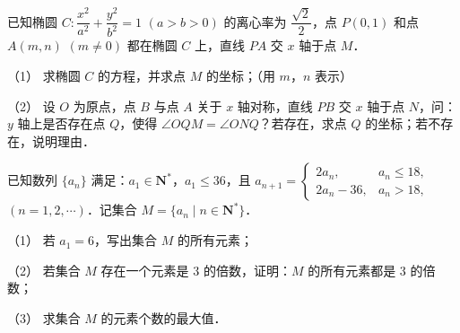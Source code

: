 \begin{question}
已知椭圆 \(C:\dfrac{x^{2}}{a^{2}}+\dfrac{y^{2}}{b^{2}}=1\) \((a>b>0)\) 的离心率为 \(\dfrac{\sqrt{2}}{2}\)，点 \(P(0,1)\) 和点 \(A(m,n)\) \((m\neq 0)\) 都在椭圆 \(C\) 上，直线 \(PA\) 交 \(x\) 轴于点 \(M\)．

（1） 求椭圆 \(C\) 的方程，并求点 \(M\) 的坐标；（用 \(m\)，\(n\) 表示）

（2） 设 \(O\) 为原点，点 \(B\) 与点 \(A\) 关于 \(x\) 轴对称，直线 \(PB\) 交 \(x\) 轴于点 \(N\)，问：\(y\) 轴上是否存在点 \(Q\)，使得 \(\angle OQM=\angle ONQ\)？若存在，求点 \(Q\) 的坐标；若不存在，说明理由．

\end{question}
\begin{question}
已知数列 \(\{a_{n}\}\) 满足：\(a_{1}\in\mathbf{N}^{*}\)，\(a_{1}\leqslant 36\)，且 $a_{n+1}=\begin{cases}2a_{n}, & a_{n}\leqslant 18,\\ 2a_{n}-36, & a_{n}>18,\end{cases}$ \((n=1,2,\cdots)\)．记集合 \(M=\{a_{n}\mid n\in\mathbf{N}^{*}\}\)．

（1） 若 \(a_{1}=6\)，写出集合 \(M\) 的所有元素；

（2） 若集合 \(M\) 存在一个元素是 \(3\) 的倍数，证明：\(M\) 的所有元素都是 \(3\) 的倍数；

（3） 求集合 \(M\) 的元素个数的最大值．

\end{question}